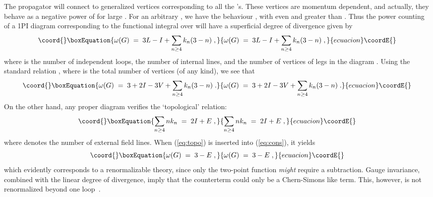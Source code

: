 \documentclass[a4paper,12pt]{article}
\begin{document}
The \coordHE{} propagator will connect to generalized vertices
corresponding to all the \coordHE{}'s. These vertices are
momentum dependent, and actually, they behave as a negative power of
\coordHE{} for large \coordHE{}.  For an arbitrary \coordHE{}, we have the behaviour
\coordHE{}, with \coordHE{} even and greater than \coordHE{}.
Thus the power counting of a 1PI diagram \coordHE{} corresponding to the
functional integral over \coordHE{} will have a superficial degree of
divergence \coordHE{} given by
\begin{equation}\coord{}\boxEquation{
  \label{eq:sdiv}
  \omega (G)\;=\; 3 L - I + \sum_{n \geq 4} k_n (3-n) \;,
}{
  \omega (G)\;=\; 3 L - I + \sum_{n \geq 4} k_n (3-n) \;,
}{ecuacion}\coordE{}\end{equation}
where \coordHE{} is the number of independent loops, \coordHE{} the number of
internal \coordHE{} lines, and \coordHE{} the number of vertices of \coordHE{} legs
in the diagram \coordHE{}. Using the standard relation \coordHE{}, where
\coordHE{} is the total number of vertices (of any kind), we see that
\begin{equation}\coord{}\boxEquation{
  \label{eq:cons}
  \omega (G)\;=\; 3 + 2 I - 3 V  + \sum_{n \geq 4} k_n (3-n) \;.
}{
  \omega (G)\;=\; 3 + 2 I - 3 V  + \sum_{n \geq 4} k_n (3-n) \;.
}{ecuacion}\coordE{}\end{equation}
On the other hand, any proper diagram verifies the `topological'
relation:
\begin{equation}\coord{}\boxEquation{
  \label{eq:topo}
  \sum_{n \geq 4} n k_n \;=\; 2 I + E \;,
}{
  \sum_{n \geq 4} n k_n \;=\; 2 I + E \;,
}{ecuacion}\coordE{}\end{equation}
where \coordHE{} denotes the number of external \coordHE{} field lines.  When
(\ref{eq:topo}) is inserted into (\ref{eq:cons}), it yields
\begin{equation}\coord{}\boxEquation{
  \label{eq:sdivf}
  \omega (G)\;=\; 3 - E \;,
}{
  \omega (G)\;=\; 3 - E \;,
}{ecuacion}\coordE{}\end{equation}
which evidently corresponds to a renormalizable theory, since only the
two-point function {\em might\/} require a subtraction.  Gauge
invariance, combined with the linear degree of divergence, imply that
the counterterm could only be a Chern-Simons like term. This, however, is
not renormalized beyond one loop~\cite{coleman}.
\end{document}
